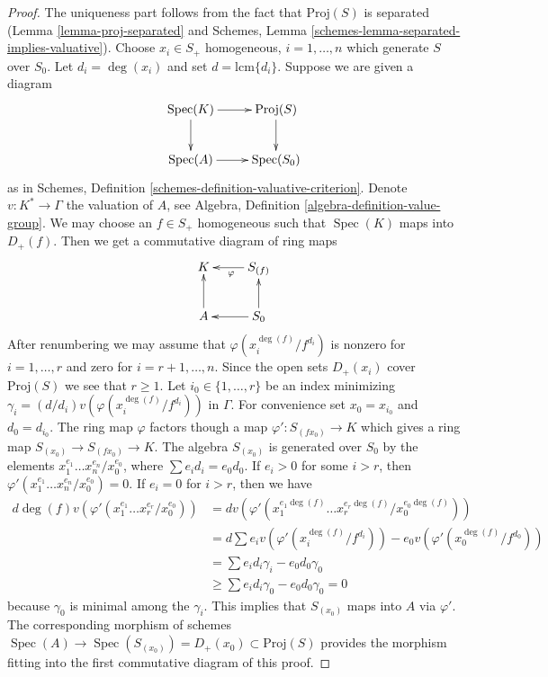 \documentclass{stacks-project}
\theoremstyle{plain}
\theoremstyle{definition}
\theoremstyle{remark}
\numberwithin{equation}{subsection}
\def\Spec{\mathop{\mathrm{Spec}}}
\begin{document}
\begin{proof}
The uniqueness part follows from the fact that $\text{Proj}(S)$ is
separated (Lemma \ref{lemma-proj-separated} and
Schemes, Lemma \ref{schemes-lemma-separated-implies-valuative}).
Choose $x_i \in S_{+}$ homogeneous, $i = 1, \ldots, n$
which generate $S$ over $S_0$. Let $d_i = \deg(x_i)$ and
set $d = \text{lcm}\{d_i\}$. Suppose we are given a diagram
$$
\xymatrix{
\Spec(K) \ar[r] \ar[d] & \text{Proj}(S) \ar[d] \\
\Spec(A) \ar[r] & \Spec(S_0)
}
$$
as in Schemes, Definition \ref{schemes-definition-valuative-criterion}.
Denote $v : K^* \to \Gamma$ the valuation of $A$, see
Algebra, Definition \ref{algebra-definition-value-group}.
We may choose an $f \in S_{+}$ homogeneous such that
$\Spec(K)$ maps into $D_{+}(f)$. Then we get a commutative
diagram of ring maps
$$
\xymatrix{
K & S_{(f)} \ar[l]^{\varphi} \\
A \ar[u] & S_0 \ar[l] \ar[u]
}
$$
After renumbering we may assume that $\varphi(x_i^{\deg(f)}/f^{d_i})$
is nonzero for $i = 1, \ldots, r$ and zero for $i = r + 1, \ldots, n$.
Since the open sets $D_{+}(x_i)$ cover $\text{Proj}(S)$ we see that $r \geq 1$.
Let $i_0 \in \{1, \ldots, r\}$ be an index minimizing
$\gamma_i = (d/d_i)v(\varphi(x_i^{\deg(f)}/f^{d_i}))$ in $\Gamma$.
For convenience set $x_0 = x_{i_0}$ and $d_0 = d_{i_0}$.
The ring map $\varphi$ factors though a map $\varphi' : S_{(fx_0)} \to K$
which gives a ring map $S_{(x_0)} \to S_{(fx_0)} \to K$.
The algebra $S_{(x_0)}$ is generated over $S_0$ by the elements
$x_1^{e_1} \ldots x_n^{e_n}/x_0^{e_0}$, where $\sum e_i d_i = e_0 d_0$.
If $e_i > 0$ for some $i > r$, then
$\varphi'(x_1^{e_1} \ldots x_n^{e_n}/x_0^{e_0}) = 0$.
If $e_i = 0$ for $i > r$, then we have
\begin{align*}
d \deg(f) v(\varphi'(x_1^{e_1} \ldots x_r^{e_r}/x_0^{e_0}))
& =
d v(\varphi'(x_1^{e_1 \deg(f)} \ldots x_r^{e_r \deg(f)}/x_0^{e_0 \deg(f)})) \\
& =
d \sum e_i v(\varphi'(x_i^{\deg(f)}/f^{d_i}))
- e_0 v(\varphi'(x_0^{\deg(f)}/f^{d_0})) \\
& =
\sum e_i d_i \gamma_i - e_0 d_0 \gamma_0 \\
& \geq
\sum e_i d_i \gamma_0 - e_0 d_0 \gamma_0 = 0
\end{align*}
because $\gamma_0$ is minimal among the $\gamma_i$.
This implies that $S_{(x_0)}$ maps into $A$ via $\varphi'$.
The corresponding morphism of schemes
$\Spec(A) \to \Spec(S_{(x_0)}) = D_{+}(x_0)
\subset \text{Proj}(S)$ provides the morphism fitting into
the first commutative diagram of this proof.
\end{proof}
\end{document}
